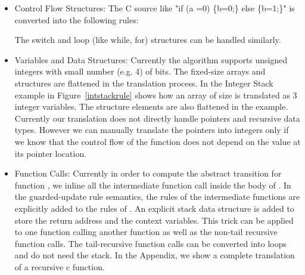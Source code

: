 \documentclass{llncs}
\begin{document}
\begin{itemize}
\item Control Flow Structures: The C source like "if (a =0) \{b=0;\} else \{b=1;\}" is converted into the following rules:

The switch and  loop (like while, for) structures can be handled similarly.

\item Variables and Data Structures: Currently the algorithm supports 
unsigned integers with small number (e.g. 4) of bits.
The fixed-size arrays and structures are flattened in the translation process. In the Integer Stack example in Figure~\ref{intstackrule} shows how an array of size  is translated as 3 integer variables.
The structure elements are also flattened in the example. 
Currently our translation does not directly handle pointers and recursive data types. 
However we can manually translate the pointers into integers only if we know that the control flow of the function does not depend on the value at its pointer location.  

\item Function Calls: Currently in order to compute the abstract transition for function , we inline all 
the intermediate function call inside the body of .
In the guarded-update rule semantics, the rules of the intermediate functions are explicitly added
to the rules of .
An explicit stack data structure is added to store the return address and the context variables.
This trick can be applied to one function calling another function as well as the  non-tail
recursive function calls.
The tail-recursive function calls can be converted into loops and do not need the stack.
In the Appendix, we show a complete translation of a recursive c function.
\end{itemize}
\end{document}
